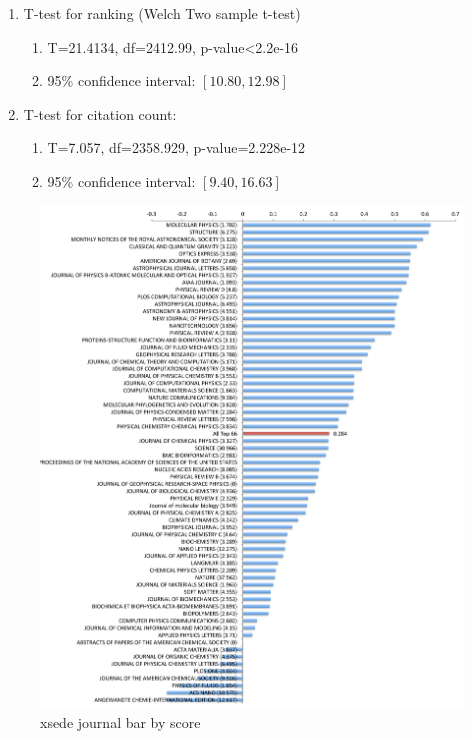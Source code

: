 \documentclass{sig-alternate}
\begin{document}
\begin{enumerate}
\item T-test for ranking (Welch Two sample t-test)
\begin{enumerate}
\item T=21.4134, df=2412.99, p-value<2.2e-16
\item 95\% confidence interval: $[10.80, 12.98]$
\end{enumerate}
\item T-test for citation count:
\begin{enumerate}
\item T=7.057, df=2358.929, p-value=2.228e-12
\item 95\% confidence interval: $[9.40, 16.63]$
\end{enumerate}
\end{enumerate}
 

\begin{figure}[htb] 
  \centering 
    \includegraphics[width=1.0\columnwidth]{images-new/xsede-journal-score.pdf} 
  \caption{xsede journal bar by score}\label{F:xsede-score} 
 \end{figure}
\end{document}

